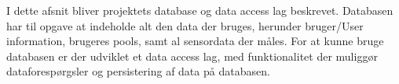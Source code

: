 I dette afsnit bliver projektets database og data access lag beskrevet. Databasen har til opgave at indeholde alt den data der bruges, herunder bruger/User information, brugeres pools, samt al sensordata der måles. For at kunne bruge databasen er der udviklet et data access lag, med funktionalitet der muliggør dataforespørgsler og persistering af data på databasen.

